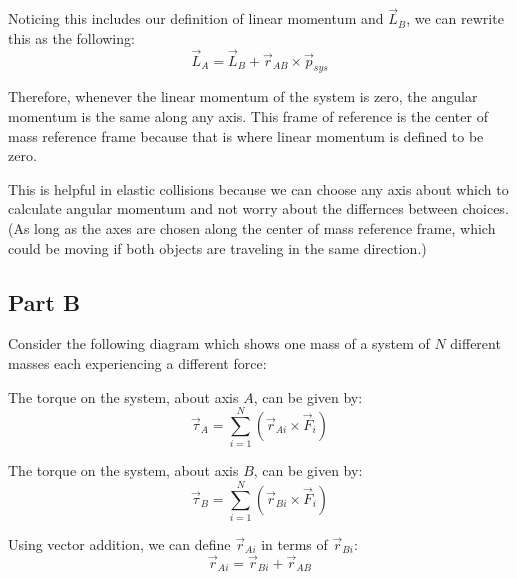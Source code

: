 \documentclass{article}
\begin{document}
Noticing this includes our definition of linear momentum and $\vec{L}_{B}$, we can
rewrite this as the following:
$$\vec{L}_A = \vec{L}_B + \vec{r}_{AB} \times \vec{p}_{sys}$$

Therefore, whenever the linear momentum of the system is zero, the angular
momentum is the same along any axis. This frame of reference is the center of
mass reference frame because that is where linear momentum is defined to be
zero.

This is helpful in elastic collisions because we can choose any axis about which
to calculate angular momentum and not worry about the differnces between
choices. (As long as the axes are chosen along the center of mass reference
frame, which could be moving if both objects are traveling in the same
direction.)

\subsection*{Part B}

Consider the following diagram which shows one mass of a system of $N$ different
masses each experiencing a different force:

\begin{figure}[H]
    \centering
\end{figure}

The torque on the system, about axis $A$, can be given by:
$$\vec{\tau}_A = \sum \limits_{i=1}^{N} \left( \vec{r}_{Ai} \times \vec{F}_i
\right)$$

The torque on the system, about axis $B$, can be given by:
$$\vec{\tau}_B = \sum \limits_{i=1}^{N} \left( \vec{r}_{Bi} \times \vec{F}_i
\right)$$

Using vector addition, we can define $\vec{r}_{Ai}$ in terms of $\vec{r}_{Bi}$:
$$\vec{r}_{Ai} = \vec{r}_{Bi} + \vec{r}_{AB}$$
\end{document}
